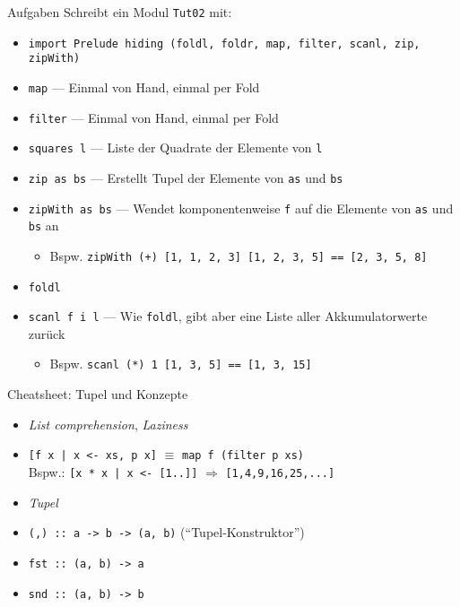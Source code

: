 \documentclass{beamer}
\begin{document}
\begin{frame}{Aufgaben}
	Schreibt ein Modul \texttt{Tut02} mit:

	\begin{itemize}
		\item \texttt{import Prelude hiding (foldl, foldr, map, filter, scanl, zip, zipWith)}
		\item \texttt{map} --- Einmal von Hand, einmal per Fold
		\item \texttt{filter} --- Einmal von Hand, einmal per Fold
		\item \texttt{squares l} --- Liste der Quadrate der Elemente von \texttt{l}
		\item \texttt{zip as bs} --- Erstellt Tupel der Elemente von \texttt{as} und \texttt{bs}
		\item \texttt{zipWith as bs} --- Wendet komponentenweise \texttt{f} auf die Elemente von \texttt{as} und \texttt{bs} an
		\begin{itemize}
			\item Bspw. \texttt{zipWith (+) [1, 1, 2, 3] [1, 2, 3, 5] == [2, 3, 5, 8]}
		\end{itemize}
   		\pause
		\item \texttt{foldl}
		\item \texttt{scanl f i l} --- Wie \texttt{foldl}, gibt aber eine Liste aller Akkumulatorwerte zurück
		\begin{itemize}
			\item Bspw. \texttt{scanl (*) 1 [1, 3, 5] == [1, 3, 15]}
		\end{itemize}
	\end{itemize}
\end{frame}

\begin{frame}{Cheatsheet: Tupel und Konzepte}
  \begin{itemize}
    \item \emph{List comprehension}, \emph{Laziness}
    \item \texttt{[f x | x <- xs, p x]} $\equiv$ \texttt{map f (filter p xs)}\\
      Bspw.: \texttt{[x * x | x <- [1..]]} $\Rightarrow$ \texttt{[1,4,9,16,25,...]}
    \item \emph{Tupel}
    \item \texttt{(,) :: a -> b -> (a, b)} (\enquote{Tupel-Konstruktor})
    \item \texttt{fst :: (a, b) -> a}
    \item \texttt{snd :: (a, b) -> b}
  \end{itemize}
\end{frame}
\end{document}
